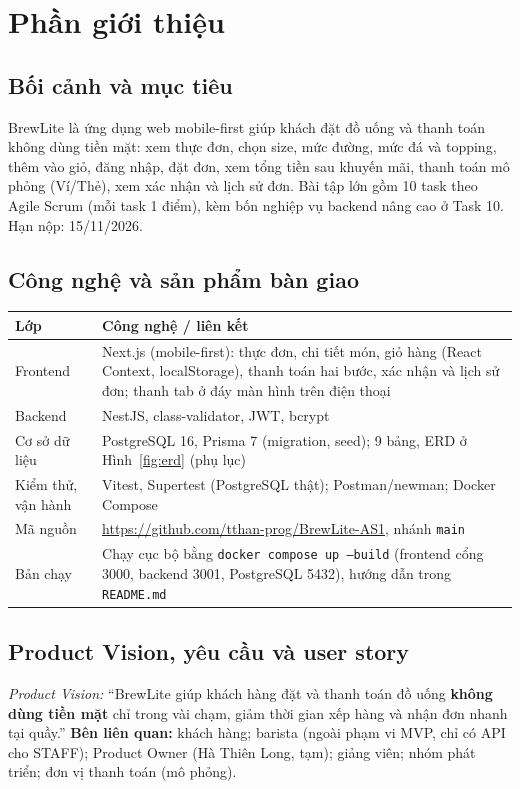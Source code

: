 \documentclass[a4paper]{article}
\begin{document}
\thispagestyle{empty}

\newpage
\tableofcontents
\newpage

\section{Phần giới thiệu}
\subsection{Bối cảnh và mục tiêu}
BrewLite là ứng dụng web mobile-first giúp khách đặt đồ uống và thanh toán không dùng tiền mặt: xem thực đơn, chọn size, mức đường, mức đá và topping, thêm vào giỏ, đăng nhập, đặt đơn, xem tổng tiền sau khuyến mãi, thanh toán mô phỏng (Ví/Thẻ), xem xác nhận và lịch sử đơn. Bài tập lớn gồm 10 task theo Agile Scrum (mỗi task 1 điểm), kèm bốn nghiệp vụ backend nâng cao ở Task 10. Hạn nộp: 15/11/2026.

\subsection{Công nghệ và sản phẩm bàn giao}
\begin{center}
\small\everymath{}
\begin{tabular}{@{}p{2.8cm}p{11.2cm}@{}}
\toprule
\textbf{Lớp} & \textbf{Công nghệ / liên kết} \\ \midrule
Frontend & Next.js (mobile-first): thực đơn, chi tiết món, giỏ hàng (React Context, localStorage), thanh toán hai bước, xác nhận và lịch sử đơn; thanh tab ở đáy màn hình trên điện thoại \\
Backend & NestJS, class-validator, JWT, bcrypt \\
Cơ sở dữ liệu & PostgreSQL 16, Prisma 7 (migration, seed); 9 bảng, ERD ở Hình~\ref{fig:erd} (phụ lục) \\
Kiểm thử, vận hành & Vitest, Supertest (PostgreSQL thật); Postman/newman; Docker Compose \\
Mã nguồn & \url{https://github.com/tthan-prog/BrewLite-AS1}, nhánh \texttt{main} \\
Bản chạy & Chạy cục bộ bằng \texttt{docker compose up --build} (frontend cổng 3000, backend 3001, PostgreSQL 5432), hướng dẫn trong \texttt{README.md} \\ \bottomrule
\end{tabular}
\end{center}

\subsection{Product Vision, yêu cầu và user story}
\textit{Product Vision:} ``BrewLite giúp khách hàng đặt và thanh toán đồ uống \textbf{không dùng tiền mặt} chỉ trong vài chạm, giảm thời gian xếp hàng và nhận đơn nhanh tại quầy.'' \textbf{Bên liên quan:} khách hàng; barista (ngoài phạm vi MVP, chỉ có API cho STAFF); Product Owner (Hà Thiên Long, tạm); giảng viên; nhóm phát triển; đơn vị thanh toán (mô phỏng).
\end{document}
